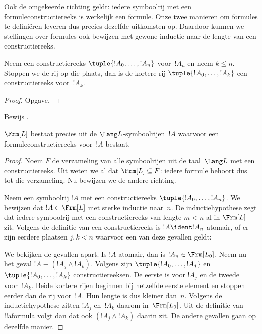 \documentclass[openany]{memoir}
\begin{document}
Ook de omgekeerde richting geldt: iedere symboolrij met een
formuleconstructiereeks is werkelijk een formule. Onze twee manieren
om formules te definiëren leveren dus precies dezelfde uitkomsten op.
Daardoor kunnen we stellingen over formules ook bewijzen met gewone
inductie naar de lengte van een constructiereeks.

\begin{lem}
Neem een constructiereeks $\tuple{!A_0,\dotsc,!A_n}$ voor~$!A_n$ en
neem $k \leq n$. Stoppen we de rij op die plaats, dan is de kortere rij
$\tuple{!A_0,\dotsc,!A_k}$ een constructiereeks voor~$!A_k$.
\end{lem}

\begin{proof}
Opgave.
\end{proof}

\begin{prob}
Bewijs .
\end{prob}

\begin{thm}
$\Frm[L]$ bestaat precies uit de $\Lang L$-symboolrijen~$!A$
waarvoor een formuleconstructiereeks voor~$!A$ bestaat.
\end{thm}

\begin{proof}
Noem $F$ de verzameling van alle symboolrijen uit de taal~$\Lang L$ met
een constructiereeks. Uit
 weten we al dat
$\Frm[L] \subseteq F$: iedere formule behoort dus tot die verzameling. Nu bewijzen we
de andere richting.

Neem een symboolrij $!A$ met een constructiereeks
$\tuple{!A_0,\dotsc,!A_n}$. We bewijzen dat $!A \in \Frm[L]$ met
sterke inductie naar~$n$. De inductiehypothese zegt dat iedere symboolrij
met een constructiereeks van lengte $m < n$ al in $\Frm[L]$ zit.
Volgens de definitie van een constructiereeks is $!A \ident !A_n$
atomair, of er zijn eerdere plaatsen $j,k < n$ waarvoor een van deze
gevallen geldt:
\begin{enumerate}
\end{enumerate}
We bekijken de gevallen apart. Is $!A$ atomair, dan is
$!A_n \in \Frm[L_0]$. Neem nu het geval
$!A \equiv (!A_j \land !A_k)$. Volgens
 zijn
$\tuple{!A_0,\dotsc,!A_j}$ en $\tuple{!A_0,\dotsc,!A_k}$
constructiereeksen. De eerste is voor $!A_j$ en de tweede voor~$!A_k$.
Beide kortere rijen beginnen bij hetzelfde eerste element en stoppen
eerder dan de rij voor~$!A$. Hun lengte is dus kleiner dan~$n$.
Volgens de inductiehypothese zitten $!A_j$ en~$!A_k$
daarom in~$\Frm[L_0]$. Uit de definitie van !!a{formula} volgt dan dat
ook $(!A_j \land !A_k)$ daarin zit. De andere gevallen gaan op dezelfde
manier.
\end{proof}
\end{document}
